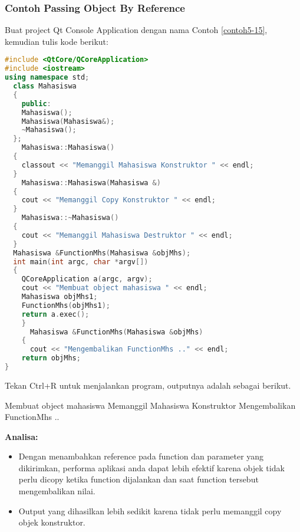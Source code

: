 \subsubsection*{Contoh  Passing Object By Reference}

Buat project Qt Console Application dengan nama Contoh \ref{contoh5-15}, kemudian
tulis kode berikut:

\begin{lstlisting}[language=c++, caption=Passing Object By Reference, label=contoh5-15]
#include <QtCore/QCoreApplication>
#include <iostream>
using namespace std;
  class Mahasiswa
  {
    public:
    Mahasiswa();
    Mahasiswa(Mahasiswa&);
    ~Mahasiswa();
  };
    Mahasiswa::Mahasiswa()
  {
    classout << "Memanggil Mahasiswa Konstruktor " << endl;
  }
    Mahasiswa::Mahasiswa(Mahasiswa &)
  {
    cout << "Memanggil Copy Konstruktor " << endl;
  }
    Mahasiswa::~Mahasiswa()
  {
    cout << "Memanggil Mahasiswa Destruktor " << endl;
  }
  Mahasiswa &FunctionMhs(Mahasiswa &objMhs);
  int main(int argc, char *argv[])
  {
    QCoreApplication a(argc, argv);
    cout << "Membuat object mahasiswa " << endl;
    Mahasiswa objMhs1;
    FunctionMhs(objMhs1);
    return a.exec();
    }
      Mahasiswa &FunctionMhs(Mahasiswa &objMhs)
    {
      cout << "Mengembalikan FunctionMhs .." << endl;
    return objMhs;
}
\end{lstlisting}

Tekan Ctrl+R untuk menjalankan program, outputnya adalah sebagai
berikut.

\begin{lcverbatim}
Membuat object mahasiswa
Memanggil Mahasiswa Konstruktor
Mengembalikan FunctionMhs ..
\end{lcverbatim}

\textbf{Analisa:}

\begin{itemize}

\item
  Dengan menambahkan reference pada function dan parameter yang
  dikirimkan, performa aplikasi anda dapat lebih efektif karena objek
  tidak perlu dicopy ketika function dijalankan dan saat function
  tersebut mengembalikan nilai.
\item
  Output yang dihasilkan lebih sedikit karena tidak perlu memanggil copy
  objek konstruktor.
\end{itemize}

